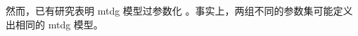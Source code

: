 然而，已有研究表明 \gls{mtdg} 模型过参数化 \cite{lebre2008algorithm}。事实上，两组不同的参数集可能定义出相同的 \gls{mtdg} 模型。
%
%
%
%
%
%
%
